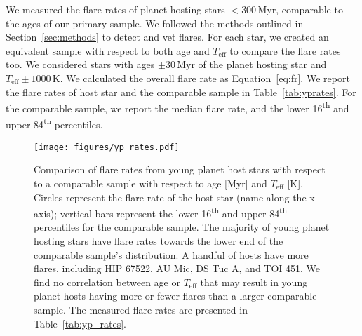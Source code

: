 \documentclass[twocolumn]{aastex631}
\begin{document}
We measured the flare rates of planet hosting stars $< 300$\,Myr, comparable to the ages of our primary sample.
We followed the methods outlined in Section~\ref{sec:methods} to detect and vet flares. For each star, we created
an equivalent sample with respect to both age and $T_\textrm{eff}$ to compare the flare rates too. We considered
stars with ages $\pm 30$\,Myr of the planet hosting star and $T_\textrm{eff} \pm 1000$\,K. We calculated the overall
flare rate as Equation~\ref{eq:fr}. We report the flare rates of host star and the comparable sample in Table~\ref{tab:yprates}.
For the comparable sample, we report the median flare rate, and the lower 16\textsuperscript{th} and upper 84\textsuperscript{th}
percentiles.

\begin{figure}[ht!]
    \begin{centering}
        \texttt{[image: figures/yp\_rates.pdf]}
        \caption{
            Comparison of flare rates from young planet host stars with respect to
            a comparable sample with respect to age [Myr] and $T_\textrm{eff}$ [K].
            Circles represent the flare rate of the host star (name along the x-axis);
            vertical bars represent the lower 16\textsuperscript{th} and upper
            84\textsuperscript{th} percentiles for the comparable sample. The majority
            of young planet hosting stars have flare rates towards the lower end of the
            comparable sample's distribution. A handful of hosts have more flares, including
            HIP 67522, AU Mic, DS Tuc A, and TOI 451. We find no correlation between
            age or $T_\textrm{eff}$ that may result in young planet hosts having more or fewer
            flares than a larger comparable sample. The measured flare rates are presented in
            Table~\ref{tab:yp_rates}.
        }
        \label{fig:yp_rates}
    \end{centering}
\end{figure}
\end{document}
